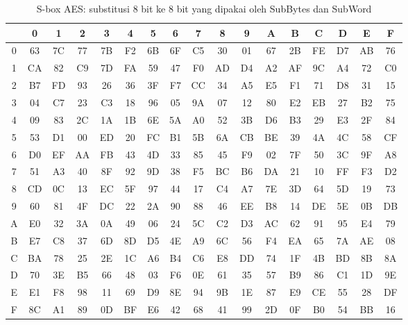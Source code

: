 \begin{table}[htbp]
\centering
\caption{S-box AES: substitusi 8 bit ke 8 bit yang dipakai oleh SubBytes dan SubWord}
\label{tab:sbox-aes}
\footnotesize
\setlength{\tabcolsep}{3.2pt}
\begin{tabular}{@{}c*{16}{c}@{}}
\hline
      & 0  & 1  & 2  & 3  & 4  & 5  & 6  & 7  & 8  & 9  & A  & B  & C  & D  & E  & F \\
\hline
0 & 63 & 7C & 77 & 7B & F2 & 6B & 6F & C5 & 30 & 01 & 67 & 2B & FE & D7 & AB & 76 \\
1 & CA & 82 & C9 & 7D & FA & 59 & 47 & F0 & AD & D4 & A2 & AF & 9C & A4 & 72 & C0 \\
2 & B7 & FD & 93 & 26 & 36 & 3F & F7 & CC & 34 & A5 & E5 & F1 & 71 & D8 & 31 & 15 \\
3 & 04 & C7 & 23 & C3 & 18 & 96 & 05 & 9A & 07 & 12 & 80 & E2 & EB & 27 & B2 & 75 \\
4 & 09 & 83 & 2C & 1A & 1B & 6E & 5A & A0 & 52 & 3B & D6 & B3 & 29 & E3 & 2F & 84 \\
5 & 53 & D1 & 00 & ED & 20 & FC & B1 & 5B & 6A & CB & BE & 39 & 4A & 4C & 58 & CF \\
6 & D0 & EF & AA & FB & 43 & 4D & 33 & 85 & 45 & F9 & 02 & 7F & 50 & 3C & 9F & A8 \\
7 & 51 & A3 & 40 & 8F & 92 & 9D & 38 & F5 & BC & B6 & DA & 21 & 10 & FF & F3 & D2 \\
8 & CD & 0C & 13 & EC & 5F & 97 & 44 & 17 & C4 & A7 & 7E & 3D & 64 & 5D & 19 & 73 \\
9 & 60 & 81 & 4F & DC & 22 & 2A & 90 & 88 & 46 & EE & B8 & 14 & DE & 5E & 0B & DB \\
A & E0 & 32 & 3A & 0A & 49 & 06 & 24 & 5C & C2 & D3 & AC & 62 & 91 & 95 & E4 & 79 \\
B & E7 & C8 & 37 & 6D & 8D & D5 & 4E & A9 & 6C & 56 & F4 & EA & 65 & 7A & AE & 08 \\
C & BA & 78 & 25 & 2E & 1C & A6 & B4 & C6 & E8 & DD & 74 & 1F & 4B & BD & 8B & 8A \\
D & 70 & 3E & B5 & 66 & 48 & 03 & F6 & 0E & 61 & 35 & 57 & B9 & 86 & C1 & 1D & 9E \\
E & E1 & F8 & 98 & 11 & 69 & D9 & 8E & 94 & 9B & 1E & 87 & E9 & CE & 55 & 28 & DF \\
F & 8C & A1 & 89 & 0D & BF & E6 & 42 & 68 & 41 & 99 & 2D & 0F & B0 & 54 & BB & 16 \\
\hline
\end{tabular}
\end{table}

